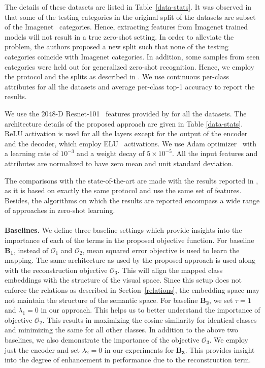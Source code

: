 \documentclass[10pt,twocolumn,letterpaper]{article}
\begin{document}
The details of these datasets are listed in Table~\ref{data-stats}.
It was observed in \cite{Xian_2017_CVPR} that some of the testing categories in the original split of the datasets are subset of the Imagenet~\cite{deng2009imagenet} categories. Hence, extracting features from Imagenet trained models will not result in a true zero-shot setting. In order to alleviate the problem, the authors proposed a new split such that none of the testing categories coincide with Imagenet categories. In addition, some samples from seen categories were held out for generalized zero-shot recognition. 
Hence, we employ the protocol and the splits as described in \cite{Xian_2017_CVPR,xian2017zero1}.
We use continuous per-class attributes for all the datasets and average per-class top-1 accuracy to report the results.

We use the 2048-D Resnet-101~\cite{he2016deep} features provided by \cite{Xian_2017_CVPR} for all the datasets. 
The architecture details of the proposed approach are given in Table \ref{data-stats}. %
ReLU activation is used for all the layers except for the output of the encoder and the decoder, which employ ELU~\cite{clevert2015fast} activations. We use Adam optimizer~\cite{kingma2014adam} with a learning rate of $10^{-3}$ and a weight decay of $5\times10^{-5}$. 
All the input features and attributes are normalized to have zero mean and unit standard deviation.

The comparisons with the state-of-the-art are made with the results reported in \cite{xian2017zero1}, as it is based on exactly the same protocol and use the same set of features. Besides, the algorithms on which the results are reported encompass a wide range of approaches in zero-shot learning. \\ \\
{\bf Baselines.} We define three baseline settings which provide insights into the importance of each of the terms in the proposed objective function. 
For baseline $\mathbf{B_1}$, instead of  $\mathcal{O}_1$ and $\mathcal{O}_2$, mean squared error objective is used to learn the mapping.
The same architecture as used by the proposed approach is used along with the reconstruction objective $\mathcal{O}_3$.  
This will align the mapped class embeddings with the structure of the visual space.
Since this setup does not enforce the relations as described in Section~\ref{relations}, the embedding space may not maintain the structure of the semantic space.
For baseline $\mathbf{B_2}$, we set $\tau = 1$ and $\lambda_1 = 0$ in our approach. This helps us to better understand the importance of objective $\mathcal{O}_2$.
This results in maximizing the cosine similarity for identical classes and minimizing the same for all other classes.
In addition to the above two baselines, we also demonstrate the importance of the objective $\mathcal{O}_3$. We employ just the encoder and set $\lambda_2=0$ in our experiments for $\mathbf{B_3}$. 
This provides insight into the degree of enhancement in performance due to the reconstruction term.
\end{document}
